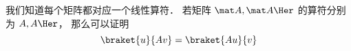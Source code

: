 

我们知道每个矩阵都对应一个线性算符． 若矩阵 $\mat A, \mat A\Her$ 的算符分别为 $A, A\Her$， 那么可以证明
\begin{equation}
\braket{u}{Av} = \braket{Au}{v}
\end{equation}
